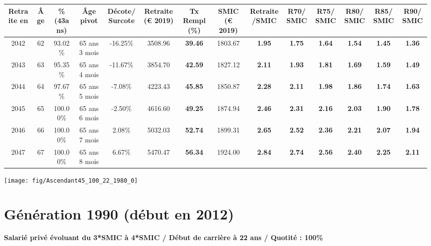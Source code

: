 \begin{adjustbox}{max width=\textwidth} 
\begin{tabular}[htb]{|c|c||c|c|c||c|c||c|c||c|c|c|c|c|} 
\hline 
 Retraite en &  Âge &  \%(43ans) &  Âge pivot &  Décote/Surcote &  Retraite (\euro{} 2019) &  Tx Rempl(\%) &  SMIC (\euro{} 2019) &  Retraite/SMIC &  R70/SMIC &  R75/SMIC &  R80/SMIC &  R85/SMIC &  R90/SMIC \\ 
\hline \hline 
 2042 &  62 &  93.02\% &  65 ans 3 mois &  -16.25\% &  3508.96 &  {\bf 39.46} &  1803.67 &  {\bf 1.95} &  {\bf 1.75} &  {\bf 1.64} &  {\bf 1.54} &  {\bf 1.45} &  {\bf 1.36} \\ 
\hline 
 2043 &  63 &  95.35\% &  65 ans 4 mois &  -11.67\% &  3854.70 &  {\bf 42.59} &  1827.12 &  {\bf 2.11} &  {\bf 1.93} &  {\bf 1.81} &  {\bf 1.69} &  {\bf 1.59} &  {\bf 1.49} \\ 
\hline 
 2044 &  64 &  97.67\% &  65 ans 5 mois &  -7.08\% &  4223.43 &  {\bf 45.85} &  1850.87 &  {\bf 2.28} &  {\bf 2.11} &  {\bf 1.98} &  {\bf 1.86} &  {\bf 1.74} &  {\bf 1.63} \\ 
\hline 
 2045 &  65 &  100.00\% &  65 ans 6 mois &  -2.50\% &  4616.60 &  {\bf 49.25} &  1874.94 &  {\bf 2.46} &  {\bf 2.31} &  {\bf 2.16} &  {\bf 2.03} &  {\bf 1.90} &  {\bf 1.78} \\ 
\hline 
 2046 &  66 &  100.00\% &  65 ans 7 mois &  2.08\% &  5032.03 &  {\bf 52.74} &  1899.31 &  {\bf 2.65} &  {\bf 2.52} &  {\bf 2.36} &  {\bf 2.21} &  {\bf 2.07} &  {\bf 1.94} \\ 
\hline 
 2047 &  67 &  100.00\% &  65 ans 8 mois &  6.67\% &  5470.47 &  {\bf 56.34} &  1924.00 &  {\bf 2.84} &  {\bf 2.74} &  {\bf 2.56} &  {\bf 2.40} &  {\bf 2.25} &  {\bf 2.11} \\ 
\hline 
\hline 
\end{tabular} 
\end{adjustbox} 
 
 \vspace{0.1cm} 

 {\hspace{-2.2cm}\texttt{[image: fig/Ascendant45\_100\_22\_1980\_0]}} 

\newpage 
 
\section{Génération 1990 (début en 2012)\label{Ascendant45_100_22_1990_0}} 
 
{\bf \noindent Salarié privé évoluant du 3*SMIC à 4*SMIC / Début de carrière à 22 ans / Quotité : 100\%}  ~ 

